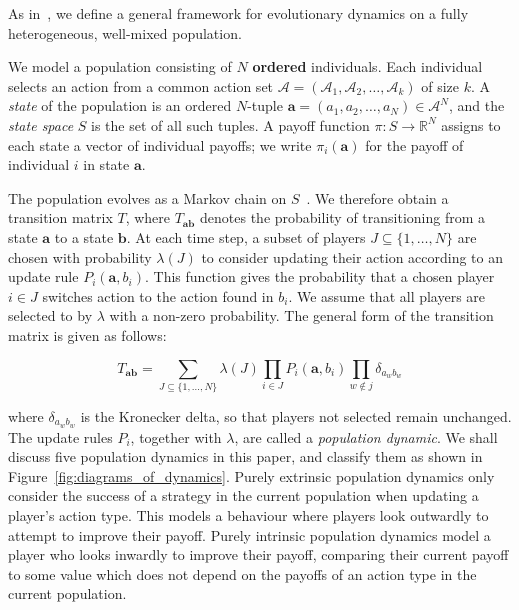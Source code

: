\documentclass{article}
\begin{document}
As in~\cite{Couto2022, Couto2023}, we define a general framework for
evolutionary dynamics on a fully heterogeneous, well-mixed population.

We model a population consisting of \(N\) \textbf{ordered} individuals. Each
individual selects an action from a common action set \(\mathcal{A} =
(\mathcal{A}_1, \mathcal{A}_2, \ldots,\mathcal{A}_k)\) of size \(k\). A
\emph{state} of the population is an ordered \(N\)-tuple \(\mathbf{a} = (a_1,
a_2, \ldots, a_N) \in \mathcal{A}^N\), and the \emph{state space} \(S\) is the
set of all such tuples. A payoff function \(\pi \colon S \to \mathbb{R}^N\)
assigns to each state a vector of individual payoffs; we write
\(\pi_i(\mathbf{a})\) for the payoff of individual \(i\) in state
\(\mathbf{a}\).

The population evolves as a Markov chain on
\(S\)~\cite{f66ea2a5-f1c3-3855-8dc0-e3047d83298e}. We therefore obtain a
transition matrix \(T\), where \(T_{\mathbf{ab}}\) denotes the probability of
transitioning from a state \(\mathbf{a}\) to a state \(\mathbf{b}\). At each
time step, a subset of players \(J \subseteq \{1, \ldots, N\}\) are chosen with
probability \(\lambda(J)\) to consider updating their action according to an
update rule \(P_i(\mathbf{a}, b_i)\). This function gives the probability that a
chosen player \(i \in J\) switches action to the action found in \(b_i\). We
assume that all players are selected to by \(\lambda\) with a non-zero
probability. The general form of the transition matrix is given as follows:

\begin{equation}
    T_{\mathbf{ab}} = \sum_{J \subseteq \{1, \ldots, N\}} \lambda(J)
    \prod_{i \in J} P_i(\mathbf{a}, b_i) \prod_{w \notin j} \delta_{a_wb_w}
    \label{eqn:general_transition}
\end{equation}

where \(\delta_{a_wb_w}\) is the Kronecker delta, so that players not selected
remain unchanged. The update rules \(P_i\), together with \(\lambda\), are
called a \emph{population dynamic}. We shall discuss five population dynamics in
this paper, and classify them as shown in Figure~\ref{fig:diagrams_of_dynamics}.
Purely extrinsic population dynamics only consider the success of a strategy in
the current population when updating a player's action type. This models a
behaviour where players look outwardly to attempt to improve their payoff.
Purely intrinsic population dynamics model a player who looks inwardly to
improve their payoff, comparing their current payoff to some value which does
not depend on the payoffs of an action type in the current population.
\end{document}
